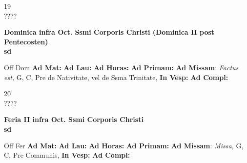\documentclass[10pt, openany]{book}
\begin{document}
    \begin{center}
        \begin{minipage}{3.5in}
            \vspace{2em}
            \begin{minipage}{0.5in}
                {\Huge 19} \\
                {\normalsize ????}
            \end{minipage}
            \begin{minipage}{3.0in}
                \textbf{ \large Dominica infra Oct. Ssmi Corporis Christi (Dominica II post Pentecosten) \\
                \textnormal{\normalsize sd}}

            \end{minipage}
            \begin{justify}Off Dom
                \textbf{Ad Mat: }
                \textbf{Ad Lau: }
                \textbf{Ad Horas: }
                \textbf{Ad Primam: }\textbf{Ad Missam}: \textit{Factus est,} G, C, Pre de Nativitate, vel de Ssma Trinitate, 
                \textbf{In Vesp: }
                \textbf{Ad Compl: }
            \end{justify}
        \end{minipage}
    \end{center}

    \begin{center}
        \begin{minipage}{3.5in}
            \vspace{2em}
            \begin{minipage}{0.5in}
                {\Huge 20} \\
                {\normalsize ????}
            \end{minipage}
            \begin{minipage}{3.0in}
                \textbf{ \large Feria II infra Oct. Ssmi Corporis Christi \\
                \textnormal{\normalsize sd}}

            \end{minipage}
            \begin{justify}Off Fer
                \textbf{Ad Mat: }
                \textbf{Ad Lau: }
                \textbf{Ad Horas: }
                \textbf{Ad Primam: }\textbf{Ad Missam}: \textit{Missa,} G, C, Pre Communis, 
                \textbf{In Vesp: }
                \textbf{Ad Compl: }
            \end{justify}
        \end{minipage}
    \end{center}
\end{document}
